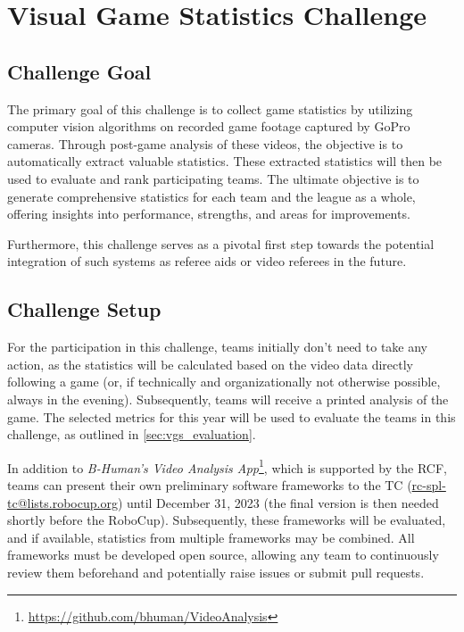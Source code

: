\section{Visual Game Statistics Challenge}

\subsection{Challenge Goal}

The primary goal of this challenge is to collect game statistics by utilizing computer vision algorithms on recorded game footage captured by GoPro cameras. Through post-game analysis of these videos, the objective is to automatically extract valuable statistics. These extracted statistics will then be used to evaluate and rank participating teams. The ultimate objective is to generate comprehensive statistics for each team and the league as a whole, offering insights into performance, strengths, and areas for improvements.

Furthermore, this challenge serves as a pivotal first step towards the potential integration of such systems as referee aids or video referees in the future.

\subsection{Challenge Setup}

For the participation in this challenge, teams initially don't need to take any action, as the statistics will be calculated based on the video data directly following a game (or, if technically and organizationally not otherwise possible, always in the evening). Subsequently, teams will receive a printed analysis of the game. The selected metrics for this year will be used to evaluate the teams in this challenge, as outlined in \cref{sec:vgs_evaluation}.

In addition to \textit{B-Human's Video Analysis App}\footnote{\url{https://github.com/bhuman/VideoAnalysis}}, which is supported by the RCF, teams can present their own preliminary software frameworks to the TC (\url{rc-spl-tc@lists.robocup.org}) until December 31, 2023 (the final version is then needed shortly before the RoboCup). Subsequently, these frameworks will be evaluated, and if available, statistics from multiple frameworks may be combined. 
All frameworks must be developed open source, allowing any team to continuously review them beforehand and potentially raise issues or submit pull requests.

